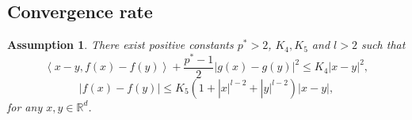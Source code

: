 \documentclass[preprint,12pt,compress]{elsarticle}
\newtheorem{assumption}[theorem]{Assumption}
\begin{document}

\subsection{Convergence rate}
\begin{assumption} \label{A3.1}
There exist positive constants ${p^ * } >2$, $K_4, K_5$ and $l > 2 $ such that 
\begin{equation}  \label{A3.1-1}
	\left\langle {x - y,f(x) - f(y)} \right\rangle  + \frac{{{p^*} - 1}}{2}{\left| {g(x) - g(y)} \right|^2} \le {K_4}{\left| {x - y} \right|^2},
\end{equation}
\begin{equation}   \label{f}
	\left| {f(x) - f(y)} \right| \le {K_5}\left( {1 + |x{|^{l-2}} + |y{|^{l-2}}} \right)\left| {x - y} \right|,
\end{equation}
for any $x, y \in \mathbb{R}^d$.
\end{assumption}
\end{document}
